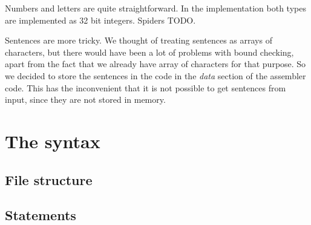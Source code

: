 \documentclass{article}
\begin{document}
Numbers and letters are quite straightforward. In the implementation
both types are implemented as 32 bit integers. Spiders TODO.

Sentences are more tricky. We thought of treating sentences as arrays
of characters, but there would have been a lot of problems with bound
checking, apart from the fact that we already have array of characters
for that purpose. So we decided to store the sentences in the code in
the \emph{data} section of the assembler code. This has the
inconvenient that it is not possible to get sentences from input,
since they are not stored in memory.

\section{The syntax}

\subsection{File structure}
\subsection{Statements}
\end{document}
